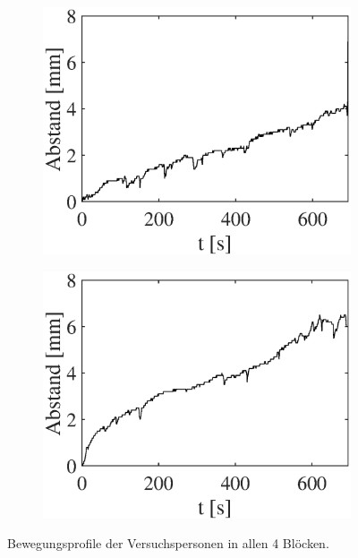 \documentclass[doc,a4paper,12pt]{apa6}
\begin{document}
\begin{figure}
\begin{subfigure}[c]{0.23\textwidth}
    \label{img:bewegung:pa10:3}
  \end{subfigure}\hspace*{0.02\textwidth}
  \begin{subfigure}[c]{0.23\textwidth}
    \includegraphics[width=\textwidth]{ergebnisse/movement/pa10a4_mc_dist_movement.eps}
    \label{img:bewegung:pa10:4}
  \end{subfigure}\hspace*{0.02\textwidth}
  \begin{subfigure}[c]{0.23\textwidth}
    \includegraphics[width=\textwidth]{ergebnisse/movement/pa10a6_mc_dist_movement.eps}
    \label{img:bewegung:pa10:6}
  \end{subfigure}
  \captionsetup{justification=justified}
  \vspace*{3mm}
  \caption[Bewegungsprofile der Versuchspersonen]{Bewegungsprofile der Versuchspersonen in allen 4 Blöcken.}
  \label{img:bewegung}
\end{figure}
\end{document}
